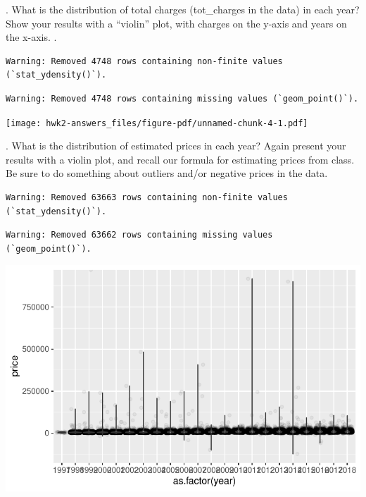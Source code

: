 \documentclass[
  letterpaper,
  DIV=11,
  numbers=noendperiod]{scrartcl}
\begin{document}
\newpage

. What is the distribution of total charges (tot\_charges in
the data) in each year? Show your results with a ``violin'' plot, with
charges on the y-axis and years on the x-axis. .

\begin{verbatim}
Warning: Removed 4748 rows containing non-finite values (`stat_ydensity()`).
\end{verbatim}

\begin{verbatim}
Warning: Removed 4748 rows containing missing values (`geom_point()`).
\end{verbatim}

\texttt{[image: hwk2-answers\_files/figure-pdf/unnamed-chunk-4-1.pdf]}

\newpage

. What is the distribution of estimated prices in each year?
Again present your results with a violin plot, and recall our formula
for estimating prices from class. Be sure to do something about outliers
and/or negative prices in the data.

\begin{verbatim}
Warning: Removed 63663 rows containing non-finite values (`stat_ydensity()`).
\end{verbatim}

\begin{verbatim}
Warning: Removed 63662 rows containing missing values (`geom_point()`).
\end{verbatim}

\includegraphics{hwk2-answers_files/figure-pdf/unnamed-chunk-5-1.pdf}

\newpage
\end{document}
